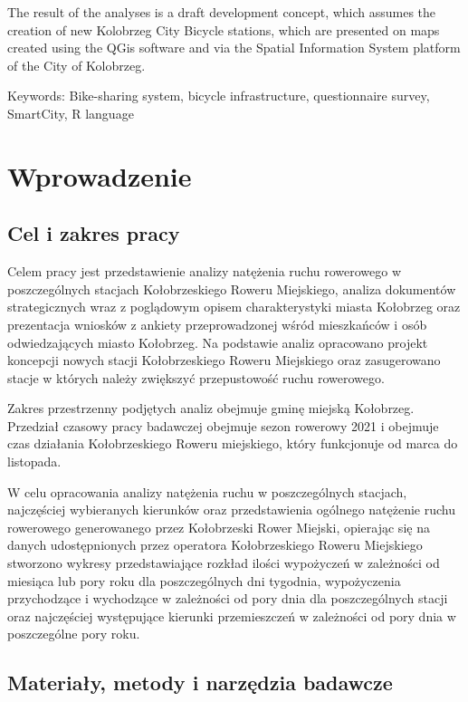 \documentclass{amuthesis}
\begin{document}
The result of the analyses is a draft development concept, which assumes the creation of new Kolobrzeg City Bicycle stations, which are presented on maps created using the QGis software and via the Spatial Information System platform of the City of Kolobrzeg.

Keywords: Bike-sharing system, bicycle infrastructure, questionnaire survey, SmartCity, R language

\newpage

\sf\tighttoc\doublespacing

\hypertarget{wprowadzenie}{%
\chapter{Wprowadzenie}\label{wprowadzenie}}

\hypertarget{cel}{%
\section{Cel i zakres pracy}\label{cel}}

Celem pracy jest przedstawienie analizy natężenia ruchu rowerowego w poszczególnych stacjach Kołobrzeskiego Roweru Miejskiego, analiza dokumentów strategicznych wraz z poglądowym opisem charakterystyki miasta Kołobrzeg oraz prezentacja wniosków z ankiety przeprowadzonej wśród mieszkańców i osób odwiedzających miasto Kołobrzeg. Na podstawie analiz opracowano projekt koncepcji nowych stacji Kołobrzeskiego Roweru Miejskiego oraz zasugerowano stacje w których należy zwiększyć przepustowość ruchu rowerowego.

Zakres przestrzenny podjętych analiz obejmuje gminę miejską Kołobrzeg.
Przedział czasowy pracy badawczej obejmuje sezon rowerowy 2021 i obejmuje czas działania Kołobrzeskiego Roweru miejskiego, który funkcjonuje od marca do listopada.

W celu opracowania analizy natężenia ruchu w poszczególnych stacjach, najczęściej wybieranych kierunków oraz przedstawienia ogólnego natężenie ruchu rowerowego generowanego przez Kołobrzeski Rower Miejski, opierając się na danych udostępnionych przez operatora Kołobrzeskiego Roweru Miejskiego stworzono wykresy przedstawiające rozkład ilości wypożyczeń w zależności od miesiąca lub pory roku dla poszczególnych dni tygodnia, wypożyczenia przychodzące i wychodzące w zależności od pory dnia dla poszczególnych stacji oraz najczęściej występujące kierunki przemieszczeń w zależności od pory dnia w poszczególne pory roku.

\hypertarget{zrodl}{%
\section{Materiały, metody i narzędzia badawcze}\label{zrodl}}
\end{document}
